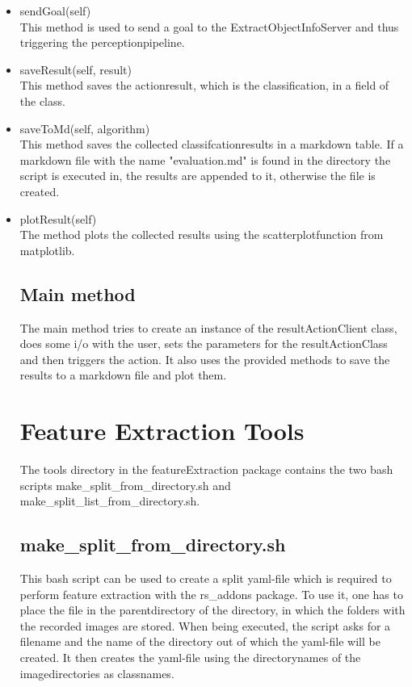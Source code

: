 \documentclass[main.tex]{subfiles}
\begin{document}
\begin{itemize}
\item 
sendGoal(self)\\
This method is used to send a goal to the ExtractObjectInfoServer and thus triggering the perceptionpipeline.

\item saveResult(self, result)\\
This method saves the actionresult, which is the classification, in a field of the class.

\item saveToMd(self, algorithm)\\
This method saves the collected classifcationresults in a markdown table. If a markdown file with the name "evaluation.md" is found in the directory the script is executed in, the results are appended to it, otherwise the file is created.

\item plotResult(self)\\
The method plots the collected results using the scatterplotfunction from matplotlib.

\subsection{Main method}
The main method tries to create an instance of the resultActionClient class, does some i/o with the user, sets the parameters for the resultActionClass and then triggers the action. It also uses the provided methods to save the results to a markdown file and plot them.

\section{Feature Extraction Tools}
The tools directory in the featureExtraction package contains the two bash scripts make\_split\_from\_directory.sh and make\_split\_list\_from\_directory.sh.

\subsection{make\_split\_from\_directory.sh} 
This bash script can be used to create a split yaml-file which is required to perform feature extraction with the rs\_addons package. To use it, one has to place the file in the parentdirectory of the directory, in which the folders with the recorded images are stored. When being executed, the script asks for a filename and the name of the directory out of which the yaml-file will be created. It then creates the yaml-file using the directorynames of the imagedirectories as classnames.


\end{itemize}
\end{document}
